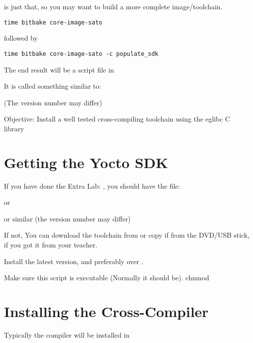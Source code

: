  is just that, so you may want to build
a more complete image/toolchain.

\begin{verbatim}
time bitbake core-image-sato
\end{verbatim}

followed by

\begin{verbatim}
time bitbake core-image-sato -c populate_sdk
\end{verbatim}
 
The end result will be a script file in 

It is called something similar to:


(The version number may differ)

  {Objective: Install a well tested cross-compiling toolchain using the eglibc C
  library}

\section{Getting the Yocto SDK}

If you have done the Extra Lab: , 
you should have the file:


or


or similar (the version number may differ)

If not, You can download the toolchain from 
or copy if from the DVD/USB stick, if you got it from your teacher.

Install the latest version, and preferably  over .

Make sure this script is executable (Normally it should be).
chnmod
\section{Installing the Cross-Compiler}

Typically the compiler will be installed in 

